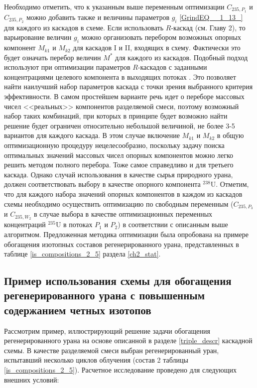 Необходимо отметить, что к указанным выше переменным оптимизации $C_{235,{P_1}}$ и $C_{235,{P_2}}$ можно добавить также и величины параметров $g_{i}$  \ref{GrindEQ__1_13_} для каждого из каскадов в схеме. Если использовать $R$-каскад (см. Главу 2), то варьирование величин $g_{i}$ можно организовать перебором возможных опорных компонент $M_{k1}$ и $M_{k2}$ для каскадов I и II, входящих в схему. Фактически это будет означать перебор величин $M^{*}$ для каждого из каскадов. Подобный подход используют при оптимизации параметров $R$-каскадов с заданными концентрациями целевого компонента в выходящих потоках \cite{songComparativeStudyModel2010, sulaberidzeSravnenieOptimalnyhModelnyh2008}. Это позволяет найти наилучший набор параметров каскада с точки зрения выбранного критерия эффективности. В самом простейшем варианте речь идет о переборе массовых чисел <<реальных>> компонентов разделяемой смеси, поэтому возможный набор таких комбинаций, при которых в принципе будет возможно найти решение будет ограничен относительно небольшой величиной, не более 3-5 вариантов для каждого каскада. В этом случае включение $M_{k1}$ и $M_{k2}$ в общую оптимизационную процедуру нецелесообразно, поскольку задачу поиска оптимальных значений массовых чисел опорных компонентов можно легко решить методом полного перебора. Тоже самое справедливо и для третьего каскада.
Однако случай использования в качестве сырья природного урана, должен соответствовать выбору в качестве опорного компонента $^{238}$U. Отметим, что для каждого набора значений опорных компонентов в каждом из каскадов схемы необходимо осуществить оптимизацию по свободным переменным ($C_{235,P_3}$ и $C_{235,W_2}$ в случае выбора в качестве оптимизационных переменных концентраций $^{235}$U в потоках $P_1$ и $P_2$) в соответствии с описанным выше алгоритмом. 
Предложенная методика оптимизации была опробована на примере обогащения изотопных составов регенерированного урана, представленных в таблице \ref{is_compositions_2_5} раздела \ref{ch2_stat}.

\subsection{Пример использования схемы для обогащения регенерированного урана с повышенным содержанием четных изотопов}\label{example_trip}

Рассмотрим пример, иллюстрирующий решение задачи обогащения регенерированного урана на основе описанной в разделе \ref{triple_descr} каскадной схемы. В качестве разделяемой смеси выбран регенерированный уран, испытавший несколько циклов облучения (состав 2 таблицы \ref{is_compositions_2_5}). Расчетное исследование проведено для следующих внешних условий:

